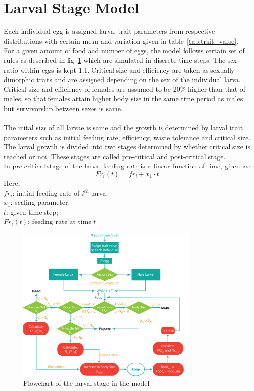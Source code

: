 \section{Larval Stage Model}
Each individual egg is assigned larval trait parameters from respective distributions with certain mean and variation given in table~\ref{tab:trait_value}. For a given amount of food and number of eggs, the model follows certain set of rules as described in fig~\ref{fig:larval_model} which are simulated in discrete time steps. The sex ratio within eggs is kept 1:1. Critical size and efficiency are taken as sexually dimorphic traits and are assigned depending on the sex of the individual larva. Critical size and efficiency of females are assumed to be 20\% higher than that of males, so that females attain higher body size in the same time period as males but survivorship between sexes is same. \citep{joshiGeneticsLarvalUrea1996,testaSexSpecificWeightLoss2013}\\ \\
The inital size of all larvae is same and the growth is determined by larval trait parameters such as initial feeding rate, efficiency, waste tolerance and critical size. The larval growth is divided into two stages determined by whether critical size is reached or not, These stages are called pre-critical and post-critical stage. \\
In pre-critical stage of the larva, feeding rate is a linear function of time, given as:
\[Fr_{i}(t) = fr_{i} + x_{1}\cdot t\]
Here, \\
$fr_{i}$: initial feeding rate of $i^{th}$ larva; \\
$x_{1}$: scaling parameter, \\
$t$: given time step; \\
$Fr_{i}(t)$: feeding rate at time $t$\\
\begin{figure}[h]
  \centering
  \includegraphics[width=0.8\textwidth]{C2/Figs/larval_model}
  \caption{Flowchart of the larval stage in the model}
  \label{fig:larval_model}
\end{figure}

